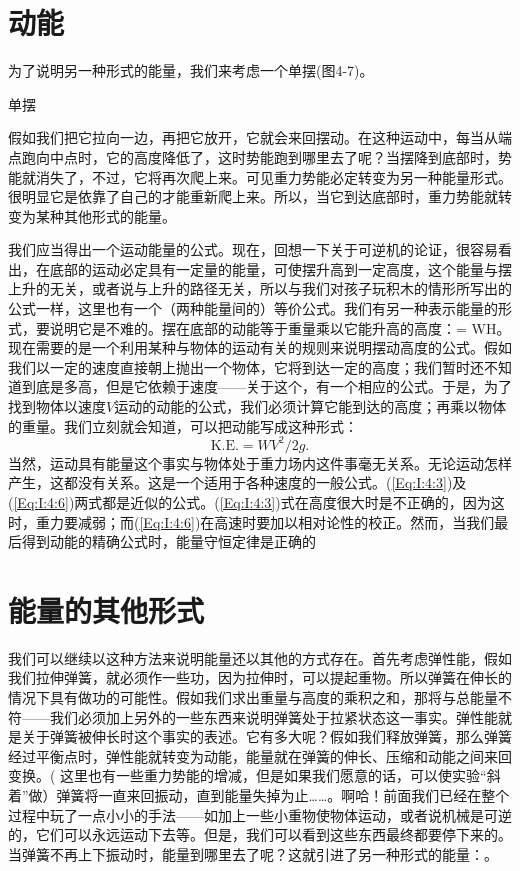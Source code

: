 \documentclass[12pt,oneside]{book}
\begin{document}
\begin{common-format}
\section{动能}
为了说明另一种形式的能量，我们来考虑一个单摆(图4-7)。
\begin{fig}{单摆}
\caption{单摆}
\label{fig:单摆}
\end{fig}
假如我们把它拉向一边，再把它放开，它就会来回摆动。在这种运动中，每当从端点跑向中点时，它的高度降低了，这时势能跑到哪里去了呢？当摆降到底部时，势能就消失了，不过，它将再次爬上来。可见重力势能必定转变为另一种能量形式。很明显它是依靠了自己的才能重新爬上来。所以，当它到达底部时，重力势能就转变为某种其他形式的能量。

我们应当得出一个运动能量的公式。现在，回想一下关于可逆机的论证，很容易看出，在底部的运动必定具有一定量的能量，可使摆升高到一定高度，这个能量与摆上升的无关，或者说与上升的路径无关，所以与我们对孩子玩积木的情形所写出的公式一样，这里也有一个（两种能量间的）等价公式。我们有另一种表示能量的形式，要说明它是不难的。摆在底部的动能等于重量乘以它能升高的高度：= WH。现在需要的是一个利用某种与物体的运动有关的规则来说明摆动高度的公式。假如我们以一定的速度直接朝上抛出一个物体，它将到达一定的高度；我们暂时还不知道到底是多高，但是它依赖于速度——关于这个，有一个相应的公式。于是，为了找到物体以速度$ V $运动的动能的公式，我们必须计算它能到达的高度；再乘以物体的重量。我们立刻就会知道，可以把动能写成这种形式：
\begin{equation}
\label{Eq:I:4:6}
\text{K.E.}=WV^2/2g.
\end{equation}
当然，运动具有能量这个事实与物体处于重力场内这件事毫无关系。无论运动怎样产生，这都没有关系。这是一个适用于各种速度的一般公式。(\ref{Eq:I:4:3})及(\ref{Eq:I:4:6})两式都是近似的公式。(\ref{Eq:I:4:3})式在高度很大时是不正确的，因为这时，重力要减弱；而(\ref{Eq:I:4:6})在高速时要加以相对论性的校正。然而，当我们最后得到动能的精确公式时，能量守恒定律是正确的


\section{能量的其他形式}
我们可以继续以这种方法来说明能量还以其他的方式存在。首先考虑弹性能，假如我们拉伸弹簧，就必须作一些功，因为拉伸时，可以提起重物。所以弹簧在伸长的情况下具有做功的可能性。假如我们求出重量与高度的乘积之和，那将与总能量不符——我们必须加上另外的一些东西来说明弹簧处于拉紧状态这一事实。弹性能就是关于弹簧被伸长时这个事实的表述。它有多大呢？假如我们释放弹簧，那么弹簧经过平衡点时，弹性能就转变为动能，能量就在弹簧的伸长、压缩和动能之间来回变换。( 这里也有一些重力势能的增减，但是如果我们愿意的话，可以使实验“斜着”做）弹簧将一直来回振动，直到能量失掉为止……。啊哈！前面我们已经在整个过程中玩了一点小小的手法——如加上一些小重物使物体运动，或者说机械是可逆的，它们可以永远运动下去等。但是，我们可以看到这些东西最终都要停下来的。当弹簧不再上下振动时，能量到哪里去了呢？这就引进了另一种形式的能量：。


\end{common-format}
\end{document}
